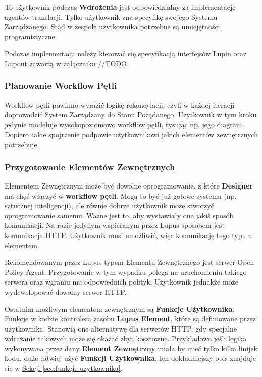 To użytkownik podczas \textbf{Wdrożenia} jest odpowiedzialny za implementację agentów translacji. Tylko użytkownik zna specyfikę swojego Systemu Zarządzanego. Stąd w zespole użytkownika potrzebne są umiejętności programistyczne. 

Podczas implementacji należy kierować się specyfikacją interfejsów Lupin oraz Lupout zawartą w załączniku //TODO.

\subsubsection{Planowanie Workflow Pętli}

Workflow pętli powinno wyrazić logikę rekoncylacji, czyli w każdej iteracji doprowadzić System Zarządzany do Stanu Pożądanego. Użytkownik w tym kroku jedynie modeluje wysokopoziomowo workflow pętli, rysując np. jego diagram. Dopiero takie spojrzenie podpowie użytkownikowi jakich elementów zewnętrznych potrzebuje.

\subsubsection{Przygotowanie Elementów Zewnętrznych}

Elementem Zewnętrznym może być dowolne oprogramowanie, z które \textbf{Designer} ma chęć włączyć w \textbf{workflow pętli}. Mogą to być już gotowe systemu (np. sztucznej inteligencji), ale równie dobrze użytkownik może stworzyć oprogramowanie samemu. Ważne jest to, aby wystawiały one jakiś sposób komunikacji. Na razie jedynym wspieranym przez Lupus sposobem jest komunikacja HTTP. Użytkownik musi umożliwić, więc komunikację tego typu z elementem.

Rekomendowanym przez Lupus typem Elementu Zewnętrznego jest serwer Open Policy Agent. Przygotowanie w tym wypadku polega na uruchomieniu takiego serwera oraz wgraniu mu odpowiednich polityk. Użytkownik jednakże może wydewelopować dowolny serwer HTTP.

Ostatnim możliwym elementem zewnętrznym są \textbf{Funkcje Użytkownika}. Funkcje w kodzie kontrolera zasobu \textbf{Lupus Element}, które są definiowane przez użytkownika. Stanowią one alternatywę dla serwerów HTTP, gdy specjalne wdrażanie takowych może się okazać zbyt kosztowne. Przykładowo jeśli logika wykonywana przez dany \textbf{Element Zewnętrzny} miała by mieć tylko kilka linijek kodu, dużo łatwiej użyć \textbf{Funkcji Użytkownika}. Ich dokładniejszy opis znajduje się w \hyperref[sec:funkcje-uzytkownika]{Sekcji \ref{sec:funkcje-uzytkownika}}.

